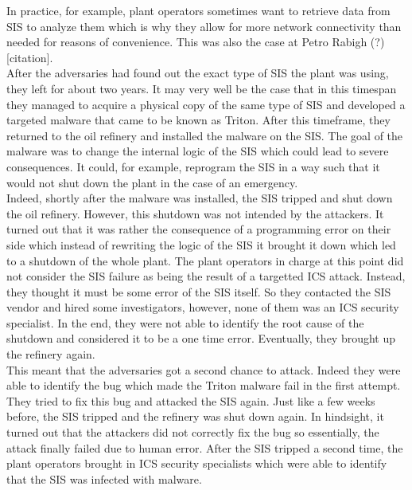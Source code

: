 \documentclass[runningheads]{llncs}
\begin{document}
In practice, for example, plant operators sometimes want to retrieve data from SIS to analyze them which is why they allow for more network connectivity than needed for reasons of convenience.
This was also the case at Petro Rabigh (?) [citation].
\cite{dragos.17}\\
After the adversaries had found out the exact type of SIS the plant was using, they left for about two years.
It may very well be the case that in this timespan they managed to acquire a physical copy of the same type of SIS and developed a targeted malware that came to be known as Triton.
After this timeframe, they returned to the oil refinery and installed the malware on the SIS.
The goal of the malware was to change the internal logic of the SIS which could lead to severe consequences.
It could, for example, reprogram the SIS in a way such that it would not shut down the plant in the case of an emergency. \cite{lee.20}\\
Indeed, shortly after the malware was installed, the SIS tripped and shut down the oil refinery.
However, this shutdown was not intended by the attackers.
It turned out that it was rather the consequence of a programming error on their side which instead of rewriting the logic of the SIS it brought it down which led to a shutdown of the whole plant.
The plant operators in charge at this point did not consider the SIS failure as being the result of a targetted ICS attack.
Instead, they thought it must be some error of the SIS itself.
So they contacted the SIS vendor and hired some investigators, however, none of them was an ICS security specialist.
In the end, they were not able to identify the root cause of the shutdown and considered it to be a one time error.
Eventually, they brought up the refinery again. \cite{lee.20}\\
This meant that the adversaries got a second chance to attack.
Indeed they were able to identify the bug which made the Triton malware fail in the first attempt.
They tried to fix this bug and attacked the SIS again.
Just like a few weeks before, the SIS tripped and the refinery was shut down again.
In hindsight, it turned out that the attackers did not correctly fix the bug so essentially, the attack finally failed due to human error.
After the SIS tripped a second time, the plant operators brought in ICS security specialists which were able to identify that the SIS was infected with malware.
\end{document}
